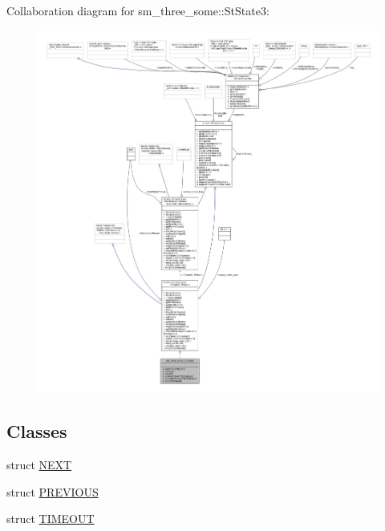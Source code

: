 Collaboration diagram for sm\+\_\+three\+\_\+some\+:\+:St\+State3\+:
\nopagebreak
\begin{figure}[H]
\begin{center}
\leavevmode
\includegraphics[width=350pt]{structsm__three__some_1_1StState3__coll__graph}
\end{center}
\end{figure}
\subsection*{Classes}
\begin{DoxyCompactItemize}
\item 
struct \hyperlink{structsm__three__some_1_1StState3_1_1NEXT}{N\+E\+XT}
\item 
struct \hyperlink{structsm__three__some_1_1StState3_1_1PREVIOUS}{P\+R\+E\+V\+I\+O\+US}
\item 
struct \hyperlink{structsm__three__some_1_1StState3_1_1TIMEOUT}{T\+I\+M\+E\+O\+UT}
\end{DoxyCompactItemize}
